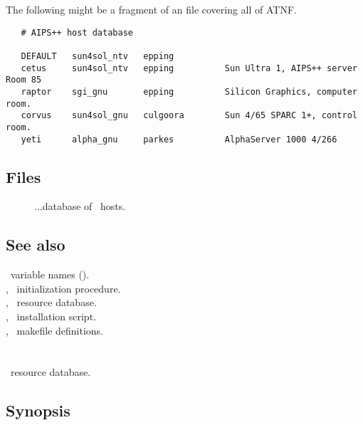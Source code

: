 The following might be a fragment of an  file covering all
of ATNF.

\begin{verbatim}
   # AIPS++ host database

   DEFAULT   sun4sol_ntv   epping
   cetus     sun4sol_ntv   epping          Sun Ultra 1, AIPS++ server Room 85
   raptor    sgi_gnu       epping          Silicon Graphics, computer room.
   corvus    sun4sol_gnu   culgoora        Sun 4/65 SPARC 1+, control room.
   yeti      alpha_gnu     parkes          AlphaServer 1000 4/266
\end{verbatim}

\subsection*{Files}

\begin{description}
\item[]
...database of \aipspp\ hosts.
\end{description}

\subsection*{See also}

\aipspp\ variable names ().\\
, \aipspp\ initialization procedure.\\
, \aipspp\ resource database.\\
, \aipspp\ installation script.\\
, \aipspp\ makefile definitions.


\newpage
\section{}
\label{aipsrc}

\aipspp\ resource database.

\subsection*{Synopsis}

\begin{synopsis}
\end{synopsis}

